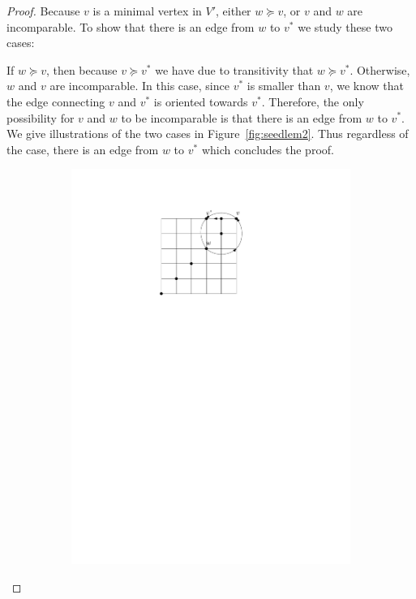 \documentclass[a4paper,10pt]{article}
\begin{document}
\begin{proof}
   Because $v$ is a minimal vertex in $V'$, either $w\succeq v$, or $v$ and $w$ are incomparable. 
   To show that there is an edge from $w$ to $v^*$ we study these two cases: 
   
If $w \succeq v$, then because $v \succeq v^*$ we have due to transitivity that $w \succeq v^*$. 
  Otherwise, $w$ and $v$ are incomparable. In this case, since $v^*$ is smaller than $v$, we know that the edge connecting $v$ and $v^*$ is  oriented towards $v^*$. 
  Therefore, the only possibility for $v$ and $w$ to be incomparable is that there is an edge from $w$ to $v^*$. 
  We give illustrations of the two cases in Figure~\ref{fig:seedlem2}. 
  Thus regardless of the case, there is an edge from $w$ to $v^*$ which concludes the proof.   
   \begin{figure}[htbp] 
       \centering
       \begin{subfigure}[b]{0.4\textwidth}
           \includegraphics[scale = 0.7]{seedlemma_fig2_cas1.pdf}

\end{subfigure}
\end{figure}
\end{proof}
\end{document}

